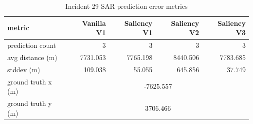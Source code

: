 \begin{table}[ht]
\centering
\caption{Incident 29 SAR prediction error metrics}
\label{tab:sar-incident-29}
\begin{tabular}{lrrrr}
\hline
metric & Vanilla V1 & Saliency V1 & Saliency V2 & Saliency V3 \\
\hline
prediction count & 3 & 3 & 3 & 3 \\
avg distance (m) & 7731.053 & 7765.198 & 8440.506 & 7783.685 \\
stddev (m) & 109.038 & 55.055 & 645.856 & 37.749 \\
ground truth x (m) & \multicolumn{4}{c}{-7625.557} \\
ground truth y (m) & \multicolumn{4}{c}{3706.466} \\
\hline
\end{tabular}
\end{table}
